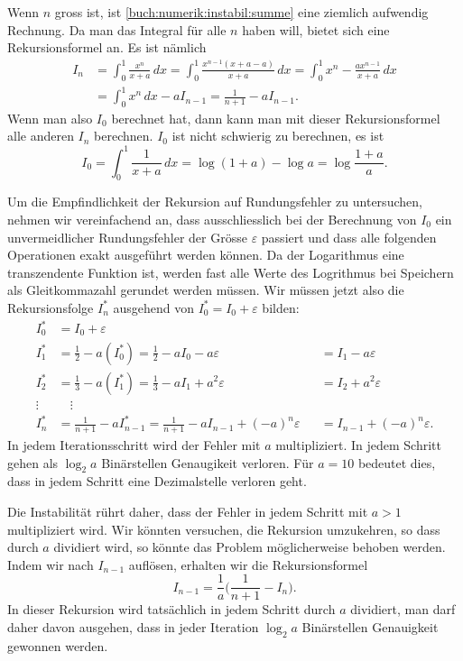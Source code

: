 Wenn $n$ gross ist, ist \eqref{buch:numerik:instabil:summe}
eine ziemlich aufwendig Rechnung.
Da man das Integral für alle $n$ haben will, bietet sich eine
Rekursionsformel an.
Es ist nämlich
\begin{align*}
I_n
&=
\int_0^1 \frac{x^n}{x+a}\,dx
=
\int_0^1 \frac{x^{n-1}(x+a-a)}{x+a}\,dx
=
\int_0^1 x^n - \frac{ax^{n-1}}{x+a}\,dx
\\
&=
\int_0^1 x^n\,dx - aI_{n-1}
=
\frac1{n+1} - a I_{n-1}.
\end{align*}
Wenn man also $I_0$ berechnet hat, dann kann man mit dieser 
Rekursionsformel alle anderen $I_n$ berechnen.
$I_0$ ist nicht schwierig zu berechnen, es ist
\[
I_0 = \int_0^1 \frac{1}{x+a}\,dx = \log(1+a) - \log a = \log\frac{1+a}a.
\]

Um die Empfindlichkeit der Rekursion auf Rundungsfehler zu untersuchen,
nehmen wir vereinfachend an, dass ausschliesslich bei der Berechnung von
$I_0$ ein unvermeidlicher Rundungsfehler der Grösse $\varepsilon$ passiert
und dass alle folgenden Operationen exakt ausgeführt werden können.
Da der Logarithmus eine transzendente Funktion ist, werden fast alle Werte
des Logrithmus bei Speichern als Gleitkommazahl gerundet werden müssen.
Wir müssen jetzt also die Rekursionsfolge $I^*_n$ ausgehend von
$I_0^* = I_0+\varepsilon$
bilden:
\[
\begin{aligned}
I_0^* &= I_0 + \varepsilon
\\
I_1^* &= \frac12 - a(I_0^*) = \frac12-aI_0 - a\varepsilon
      &&=I_1 - a \varepsilon
\\
I_2^* &= \frac13 - a(I_1^*) = \frac13-aI_1 + a^2\varepsilon
      &&=I_2 + a^2 \varepsilon
\\
\vdots\;&\quad\vdots\\
I_n^* &= \frac{1}{n+1} -aI_{n-1}^* = \frac{1}{n+1} - aI_{n-1} + (-a)^n\varepsilon
      &&= I_{n-1} + (-a)^n\varepsilon.
\end{aligned}
\]
In jedem Iterationsschritt wird der Fehler mit $a$ multipliziert.
In jedem Schritt gehen als $\log_2a$ Binärstellen Genaugikeit verloren.
Für $a=10$ bedeutet dies, dass in jedem Schritt eine Dezimalstelle
verloren geht.

Die Instabilität rührt daher, dass der Fehler in jedem Schritt mit
$a>1$ multipliziert wird.
Wir könnten versuchen, die Rekursion umzukehren, so dass durch $a$ 
dividiert wird, so könnte das Problem möglicherweise behoben werden.
Indem wir nach $I_{n-1}$ auflösen, erhalten wir die Rekursionsformel
\[
I_{n-1} = \frac1{a} \biggl(
\frac{1}{n+1} -I_n\biggr).
\]
In dieser Rekursion wird tatsächlich in jedem Schritt durch $a$ dividiert,
man darf daher davon ausgehen, dass in jeder Iteration 
$\log_2a$ Binärstellen Genauigkeit gewonnen werden.

